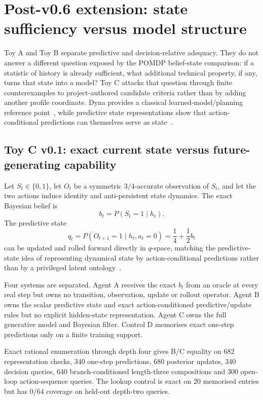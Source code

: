 \documentclass[10pt]{article}
\begin{document}
\section{Post-v0.6 extension: state sufficiency versus model structure}
\label{sec:toyc}

Toy A and Toy B separate predictive and decision-relative adequacy. They do not answer a different question exposed by the POMDP belief-state comparison: if a statistic of history is already sufficient, what additional technical property, if any, turns that state into a model? Toy C attacks that question through finite counterexamples to project-authored candidate criteria rather than by adding another profile coordinate. Dyna provides a classical learned-model/planning reference point~\cite{sutton1991}, while predictive state representations show that action-conditional predictions can themselves serve as state~\cite{littman2001}.

\subsection{Toy C v0.1: exact current state versus future-generating capability}

Let $S_t\in\{0,1\}$, let $O_t$ be a symmetric $3/4$-accurate observation of $S_t$, and let the two actions induce identity and anti-persistent state dynamics. The exact Bayesian belief is
\[
b_t=P(S_t=1\mid h_t).
\]
The predictive state
\[
q_t=P(O_{t+1}=1\mid h_t,a_t=0)
=\frac14+\frac12 b_t
\]
can be updated and rolled forward directly in $q$-space, matching the predictive-state idea of representing dynamical state by action-conditional predictions rather than by a privileged latent ontology~\cite{littman2001}.

Four systems are separated. Agent A receives the exact $b_t$ from an oracle at every real step but owns no transition, observation, update or rollout operator. Agent B owns the scalar predictive state and exact action-conditioned predictive/update rules but no explicit hidden-state representation. Agent C owns the full generative model and Bayesian filter. Control D memorises exact one-step predictions only on a finite training support.

Exact rational enumeration through depth four gives B/C equality on 682 representation checks, 340 one-step predictions, 680 posterior updates, 340 decision queries, 640 branch-conditioned length-three compositions and 300 open-loop action-sequence queries. The lookup control is exact on 20 memorised entries but has $0/64$ coverage on held-out depth-two queries.
\end{document}
